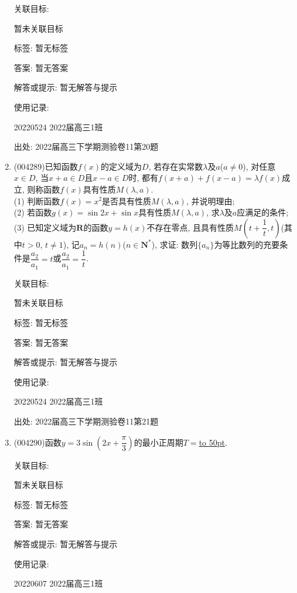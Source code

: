 \documentclass[10pt,a4paper]{article}
\newcommand{\blank}[1]{\underline{\hbox to #1pt{}}}
\begin{document}
\begin{enumerate}[1.]
关联目标:

暂未关联目标



标签: 暂无标签

答案: 暂无答案

解答或提示: 暂无解答与提示

使用记录:

20220524	2022届高三1班			


出处: 2022届高三下学期测验卷11第20题
\item { (004289)}已知函数$f(x)$的定义域为$D$, 若存在实常数$\lambda$及$a$($a\ne 0$), 对任意$x\in D$, 当$x+a\in D$且$x-a\in D$时, 都有$f(x+a)+f(x-a)=\lambda f(x)$成立, 则称函数$f(x)$具有性质$M(\lambda,a)$.\\
(1) 判断函数$f(x)=x^2$是否具有性质$M(\lambda,a)$, 并说明理由;\\
(2) 若函数$g(x)=\sin 2x+\sin x$具有性质$M(\lambda,a)$, 求$\lambda$及$a$应满足的条件;\\
(3) 已知定义域为$\mathbf{R}$的函数$y=h(x)$不存在零点, 且具有性质$M(t+\dfrac{1}{t},t)$(其中$t>0$, $t\ne 1$), 记$a_n=h(n)$($n\in \mathbf{N}^*$), 求证: 数列$\{a_n\}$为等比数列的充要条件是$\dfrac{a_2}{a_1}=t$或$\dfrac{a_2}{a_1}=\dfrac{1}{t}$.


关联目标:

暂未关联目标



标签: 暂无标签

答案: 暂无答案

解答或提示: 暂无解答与提示

使用记录:

20220524	2022届高三1班			


出处: 2022届高三下学期测验卷11第21题
\item { (004290)}函数$y=3\sin(2x+\dfrac{\pi}3)$的最小正周期$T=$\blank{50}.


关联目标:

暂未关联目标



标签: 暂无标签

答案: 暂无答案

解答或提示: 暂无解答与提示

使用记录:

20220607	2022届高三1班	



\end{enumerate}
\end{document}
